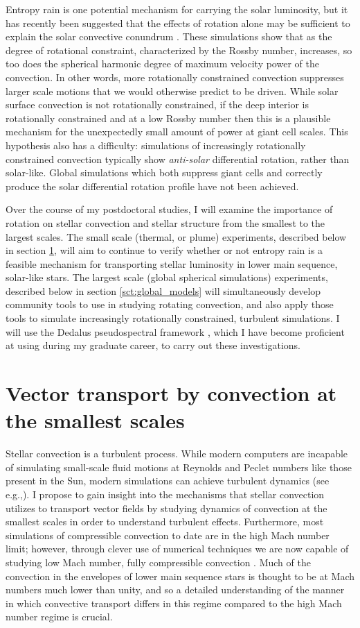 \documentclass[aasms,12pt]{article}
\begin{document}
Entropy rain is one potential mechanism for carrying the solar luminosity, but it has recently been suggested that the effects of rotation alone may be sufficient to explain the solar convective conundrum \citep{featherstone&hindman2016}.
These simulations show that as the degree of rotational constraint, characterized by the Rossby number, increases, so too does the spherical harmonic degree of maximum velocity power of the convection.
In other words, more rotationally constrained convection suppresses larger scale motions that we would otherwise predict to be driven.
While solar surface convection is not rotationally constrained, if the deep interior is rotationally constrained and at a low Rossby number then this is a plausible mechanism for the unexpectedly small amount of power at giant cell scales.
This hypothesis also has a difficulty: simulations of increasingly rotationally constrained convection typically show \emph{anti-solar} differential rotation, rather than solar-like.
Global simulations which both suppress giant cells and correctly produce the solar differential rotation profile have not been achieved.

Over the course of my postdoctoral studies, I will examine the importance of rotation on stellar convection and stellar structure from the smallest to the largest scales.
The small scale (thermal, or plume) experiments, described below in section \ref{sct:thermals}, will aim to continue to verify whether or not entropy rain is a feasible mechanism for transporting stellar luminosity in lower main sequence, solar-like stars.
The largest scale (global spherical simulations) experiments, described below in section \ref{sct:global_models} will simultaneously develop community tools to use in studying rotating convection, and also apply those tools to simulate increasingly rotationally constrained, turbulent simulations.
I will use the Dedalus pseudospectral framework \citep{burns&all2019}, which I have become proficient at using during my graduate career, to carry out these investigations.


\section{Vector transport by convection at the smallest scales}
\label{sct:thermals}
Stellar convection is a turbulent process.
While modern computers are incapable of simulating small-scale fluid motions at Reynolds and Peclet numbers like those present in the Sun, modern simulations can achieve turbulent dynamics (see e.g.,).
I propose to gain insight into the mechanisms that stellar convection utilizes to transport vector fields by studying dynamics of convection at the smallest scales in order to understand turbulent effects.
Furthermore, most simulations of compressible convection to date are in the high Mach number limit; however, through clever use of numerical techniques we are now capable of studying low Mach number, fully compressible convection \citep{anders&brown2017}.
Much of the convection in the envelopes of lower main sequence stars is thought to be at Mach numbers much lower than unity, and so a detailed understanding of the manner in which convective transport differs in this regime compared to the high Mach number regime is crucial.
\end{document}
